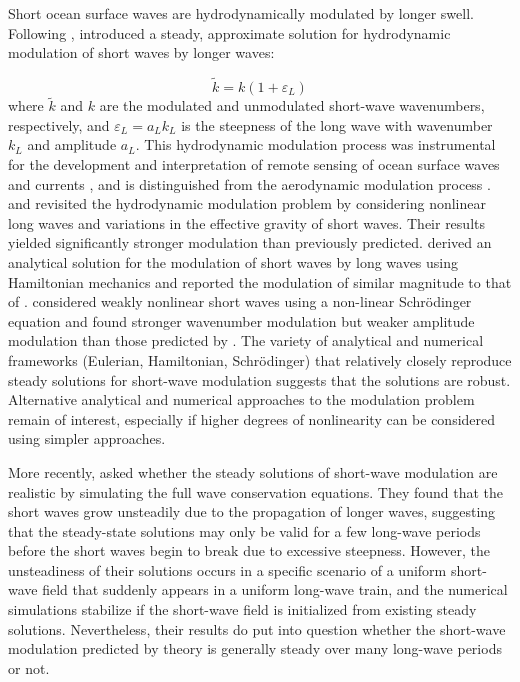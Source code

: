 \documentclass[lineno]{jfm}
\begin{document}
Short ocean surface waves are hydrodynamically modulated by longer swell.
Following \citet{unna1941white,unna1942waves,unna1947sea},
\citet{longuet1960changes} introduced a steady, approximate solution for
hydrodynamic modulation of short waves by longer waves:

\begin{equation}
\label{eq:lhs1960wavenumber}
\widetilde{k} = k (1 + \varepsilon_L)
\end{equation}
where $\widetilde{k}$ and $k$ are the modulated and unmodulated short-wave wavenumbers,
respectively, and $\varepsilon_L = a_L k_L$ is the steepness of the long wave with
wavenumber $k_L$ and amplitude $a_L$.
This hydrodynamic modulation process was instrumental for the development and
interpretation of remote sensing of ocean surface waves and currents
\citep{keller1975microwave,hara1994hydrodynamic}, and is distinguished
from the aerodynamic modulation process \citep{donelan1987effect,belcher1999wave,chen2000effects}.
\citet{phillips1981dispersion} and \citet{longuet1987propagation} revisited the
hydrodynamic modulation problem by considering nonlinear long waves and
variations in the effective gravity of short waves.
Their results yielded significantly stronger modulation than previously predicted.
\citet{henyey1988energy} derived an analytical solution for the modulation of
short waves by long waves using Hamiltonian mechanics and reported the modulation
of similar magnitude to that of \citet{longuet1987propagation}.
\citet{zhang1990evolution} considered weakly nonlinear short waves
using a non-linear Schr\" odinger equation and found stronger wavenumber
modulation but weaker amplitude modulation than those predicted by
\citet{longuet1987propagation}.
The variety of analytical and numerical frameworks (Eulerian, Hamiltonian,
Schr\" odinger) that relatively closely reproduce steady solutions for short-wave
modulation suggests that the solutions are robust.
Alternative analytical and numerical approaches to the modulation problem remain
of interest, especially if higher degrees of nonlinearity can be considered
using simpler approaches.

More recently, \citet{peureux2021unsteady} asked whether the steady solutions
of short-wave modulation are realistic by simulating the full wave conservation
equations.
They found that the short waves grow unsteadily due to the propagation of
longer waves, suggesting that the steady-state solutions may only be valid for
a few long-wave periods before the short waves begin to break due to excessive
steepness.
However, the unsteadiness of their solutions occurs in a specific scenario of
a uniform short-wave field that suddenly appears in a uniform long-wave train,
and the numerical simulations stabilize if the short-wave field is initialized
from existing steady solutions.
Nevertheless, their results do put into question whether the short-wave
modulation predicted by theory is generally steady over many long-wave periods
or not.
\end{document}
